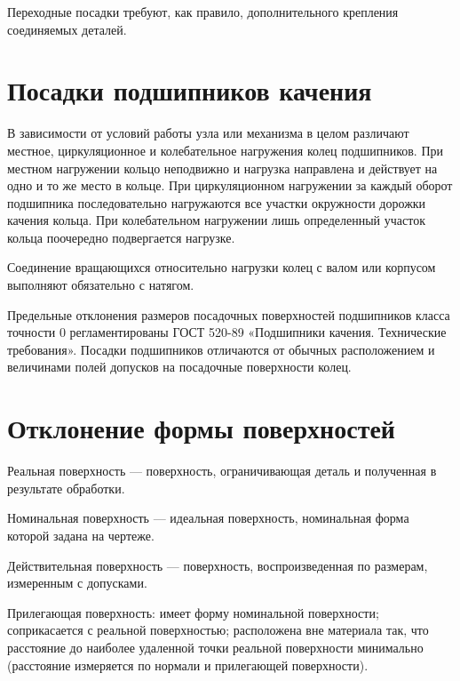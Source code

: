 Переходные посадки требуют, как правило, дополнительного крепления соединяемых деталей.

\section{Посадки подшипников качения}

В зависимости от условий работы узла или механизма в целом различают местное, циркуляционное и колебательное нагружения колец подшипников. При местном нагружении кольцо неподвижно и нагрузка направлена и действует на одно и то же место в кольце. При циркуля­ционном нагружении за каждый оборот подшипника последовательно нагружаются все участки окружности дорожки качения кольца. При колебательном нагружении лишь определенный участок кольца пооче­редно подвергается нагрузке.

Соединение вращающихся относительно нагрузки колец с валом или корпусом выполняют обязательно с натягом.

Предельные отклонения размеров посадочных поверхностей подшип­ников класса точности 0 регламентированы ГОСТ 520-89 «Подшипники качения. Технические требования». Посадки подшипников отличаются от обычных расположением и величинами полей допусков на поса­дочные поверхности колец.

\section{Отклонение формы поверхностей}

Реальная поверхность --- поверхность, ограничивающая деталь и полученная в результате обработки.

Номинальная поверхность --- идеальная поверхность, номинальная форма которой задана на чертеже.

Действительная поверхность --- поверхность, воспроизведенная по размерам, измеренным с допусками.

Прилегающая поверхность: имеет форму номинальной поверхности; соприкасается с реальной поверхностью; расположена вне материала так, что расстояние до наиболее удаленной точки реальной поверхности минимально (расстояние измеряется по нормали и прилегающей поверхности).

